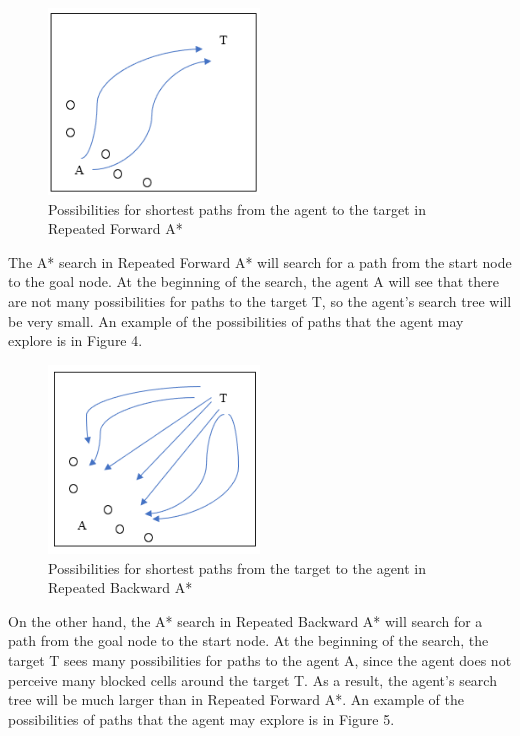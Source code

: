 \documentclass{article}
\begin{document}
\begin{figure}[h!]
  \includegraphics[width=0.5\textwidth]{p3_1.png}
  \caption{Possibilities for shortest paths from the agent to the target in Repeated Forward A*}
\end{figure}

The A* search in Repeated Forward A* will search for a path from the start node to the goal node. At the beginning of the search, the agent A will see that there are not many possibilities for paths to the target T, so the agent's search tree will be very small. An example of the possibilities of paths that the agent may explore is in Figure 4.\\

\begin{figure}[h!]
  \includegraphics[width=0.5\textwidth]{p3_2.png}
  \caption{Possibilities for shortest paths from the target to the agent in Repeated Backward A*}
\end{figure}


On the other hand, the A* search in Repeated Backward A* will search for a path from the goal node to the start node. At the beginning of the search, the target T sees many possibilities for paths to the agent A, since the agent does not perceive many blocked cells around the target T. As a result, the agent's search tree will be much larger than in Repeated Forward A*. An example of the possibilities of paths that the agent may explore is in Figure 5. \\
\end{document}
